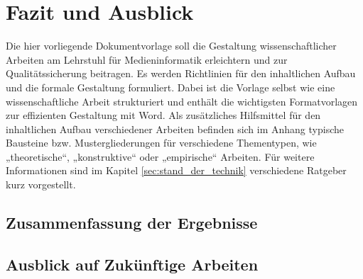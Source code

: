\chapter{Fazit und Ausblick}\label{sec:Fazit}

Die hier vorliegende Dokumentvorlage soll die Gestaltung wissenschaftlicher Arbeiten am Lehrstuhl für Medieninformatik erleichtern und zur Qualitätssicherung beitragen. Es werden Richtlinien für den inhaltlichen Aufbau und die formale Gestaltung formuliert. Dabei ist die Vorlage selbst wie eine wissenschaftliche Arbeit strukturiert und enthält die wichtigsten Formatvorlagen zur effizienten Gestaltung mit Word. Als zusätzliches Hilfsmittel für den inhaltlichen Aufbau verschiedener Arbeiten befinden sich im Anhang typische Bausteine bzw. Mustergliederungen für verschiedene Thementypen, wie „theoretische“, „konstruktive“ oder „empirische“ Arbeiten. Für weitere Informationen sind im Kapitel \ref{sec:stand_der_technik} verschiedene Ratgeber kurz vorgestellt. 

\section{Zusammenfassung der Ergebnisse}


\section{Ausblick auf Zukünftige Arbeiten}
